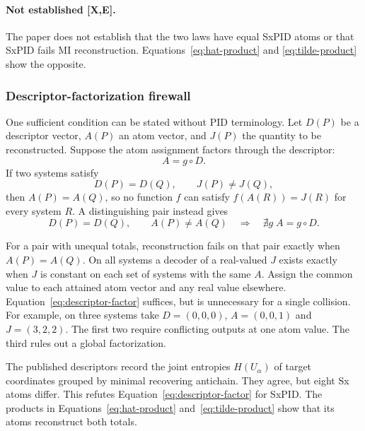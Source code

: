 \documentclass[11pt]{article}
\newcommand{\evidence}[1]{\textbf{[#1]}}
\begin{document}
\paragraph{Not established \evidence{X,E}.}
The paper does not establish that the two laws have equal SxPID atoms or that
SxPID fails MI reconstruction.  Equations~\eqref{eq:hat-product} and
\eqref{eq:tilde-product} show the opposite.

\subsubsection{Descriptor-factorization firewall}

One sufficient condition can be stated without PID terminology.  Let $D(P)$ be a
descriptor vector, $A(P)$ an atom vector, and $J(P)$ the quantity to be
reconstructed.  Suppose the atom assignment factors through the descriptor:
\begin{equation}
A=g\circ D.
\label{eq:descriptor-factor}
\end{equation}
If two systems satisfy
\begin{equation}
D(P)=D(Q),\qquad J(P)\ne J(Q),
\label{eq:descriptor-collision}
\end{equation}
then $A(P)=A(Q)$, so no function $f$ can satisfy
$f(A(R))=J(R)$ for every system $R$.  A distinguishing pair instead gives
\begin{equation}
D(P)=D(Q),\qquad A(P)\ne A(Q)
\quad\Longrightarrow\quad
\nexists g\; A=g\circ D.
\label{eq:factorization-refuted}
\end{equation}

For a pair with unequal totals, reconstruction fails on that pair exactly when
$A(P)=A(Q)$.  On all systems a decoder of a real-valued $J$ exists exactly
when $J$ is constant on each set of systems with the same $A$.  Assign the
common value to each attained atom vector and any real value elsewhere.
Equation~\eqref{eq:descriptor-factor} suffices, but is unnecessary for a single
collision.  For example, on three systems take $D=(0,0,0)$, $A=(0,0,1)$
and $J=(3,2,2)$.  The first two require conflicting outputs at one atom
value.  The third rules out a global factorization.

The published descriptors record the joint entropies $H(U_\alpha)$ of target
coordinates grouped by minimal recovering antichain.  They agree, but eight Sx
atoms differ.  This refutes Equation~\eqref{eq:descriptor-factor} for SxPID\@.
The products in Equations~\eqref{eq:hat-product} and~\eqref{eq:tilde-product}
show that its atoms reconstruct both totals.
\end{document}
